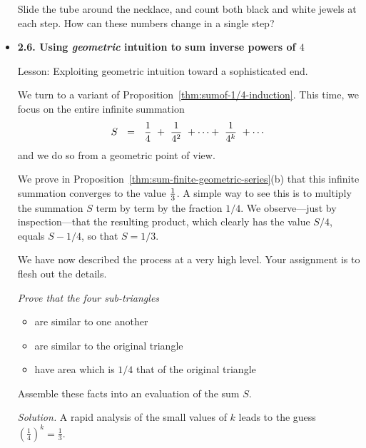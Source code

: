 \begin{itemize}
\smallskip

\smallskip

Slide the tube around the necklace, and count both black and white jewels at each step.  
How can these numbers change in a single step?
\medskip \item
{\bf 2.6. Using {\em geometric} intuition to sum inverse powers of $4$}

{\sc Lesson:} Exploiting geometric intuition toward a sophisticated end.

\smallskip

We turn to a variant of Proposition~\ref{thm:sumof-1/4-induction}.  This time, we focus on the entire infinite summation
\[ S \ \ = \ \  {1 \over 4} \ + \  {1 \over 4^2} \ + \cdots + \ {1 \over 4^k} \ + \cdots  \]
and we do so from a geometric point of view.

\smallskip

We prove in Proposition~\ref{thm:sum-finite-geometric-series}(b) that this infinite summation converges to the value ${1 \over 3}$.  A simple way to see this is to multiply the summation $S$ term by term by the fraction $1/4$.  We observe---just by inspection---that the resulting product, which clearly has the value $S/4$, equals $S - 1/4$, so that $S = 1/3$.

\smallskip

We have now described the process at a very high level.  
Your assignment is to flesh out the details.  {\em Prove that the four sub-triangles
\begin{itemize}
\item
are similar to one another
\item
are similar to the original triangle
\item
have area which is $1/4$ that of the original triangle
\end{itemize}
Assemble these facts into an evaluation of the sum $S$.
}

\noindent \textit{Solution.}
A rapid analysis of the small values of $k$ leads to the guess $(\frac{1}{4})^k = \frac{1}{3}$.
 

\end{itemize}
